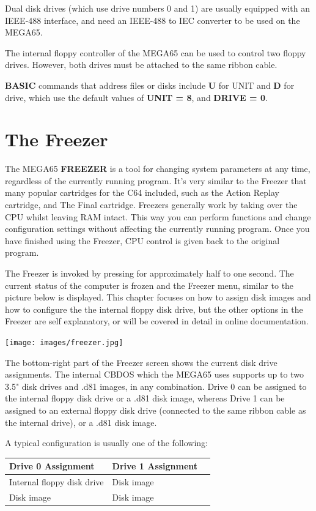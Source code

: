 Dual disk drives (which use drive numbers 0 and 1) are usually equipped with an IEEE-488 interface, and need
an IEEE-488 to IEC converter to be used on the MEGA65.

The internal floppy controller of the MEGA65 can be used to control
two floppy drives. However, both drives must be attached to the same ribbon cable.

{\bf BASIC} commands that address files or disks include
{\bf U} for UNIT and {\bf D} for drive, which use the default values of
{\bf UNIT = 8}, and {\bf DRIVE = 0}.

\section{The Freezer}
The MEGA65 {\bf FREEZER} is a tool for changing system parameters at any time,
regardless of the currently running program. It's very similar to the Freezer that many popular cartridges
for the C64 included, such as the Action Replay cartridge, and The Final cartridge. Freezers generally work by
taking over the CPU whilst leaving RAM intact. This way you can perform functions and change configuration
settings without affecting the currently running program. Once you have finished using the Freezer, CPU control
is given back to the original program.


The Freezer is invoked by pressing  for approximately half to one second.
The current status of the computer is frozen and the Freezer menu,
similar to the picture below is displayed. This chapter focuses on how to assign disk images and how to configure the
the internal floppy disk drive, but the other options in the Freezer are self explanatory, or will be covered in detail in
online documentation.

\begin{center}
\texttt{[image: images/freezer.jpg]}
\end{center}

The bottom-right part of the Freezer screen shows the current disk drive assignments.
The internal CBDOS which the MEGA65 uses supports up to two
3.5" disk drives and .d81 images, in any combination.
Drive 0 can be assigned to the internal floppy disk drive or a .d81 disk image,
whereas Drive 1 can be assigned to an external floppy disk drive (connected to the
same ribbon cable as the internal drive), or a .d81 disk image.

A typical configuration is usually one of the following:
\begin{center}
\begin{tabular}{|l|l|l|}
\hline
{\bf Drive 0 Assignment} & {\bf Drive 1 Assignment} \\
\hline
Internal floppy disk drive &  Disk image \\
Disk image                 &  Disk image \\
\hline
\end{tabular}
\end{center}

